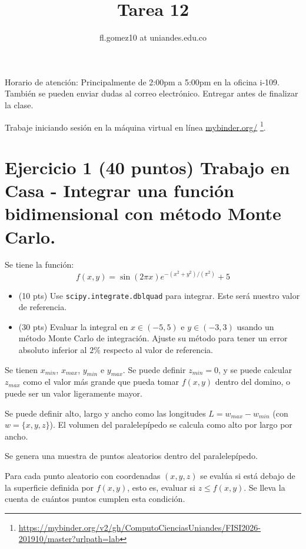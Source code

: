 \documentclass{article}
\title{Tarea 12}
\author{fl.gomez10 at uniandes.edu.co}
\begin{document}
\maketitle

Horario de atención: Principalmente de 2:00pm a 5:00pm en la oficina i-109.
También se pueden enviar dudas al correo electrónico.
Entregar antes de finalizar la clase. 

Trabaje iniciando  sesión en la máquina virtual en línea
\href{https://mybinder.org/v2/gh/ComputoCienciasUniandes/FISI2026-201910/master?urlpath=lab}{mybinder.org/}
\footnote{\url{https://mybinder.org/v2/gh/ComputoCienciasUniandes/FISI2026-201910/master?urlpath=lab}}. 


\section{Ejercicio 1 (40 puntos) Trabajo en Casa - Integrar una función bidimensional con método Monte Carlo.}

Se tiene la función:
\begin{equation}
  f(x,y) = \sin \left(2 \pi x \right) e^{-(x^2 + y^2)/(\pi^2)} + 5
\end{equation}

\begin{itemize}
\item (10 pts) Use \texttt{scipy.integrate.dblquad} para integrar. Este será nuestro valor de referencia.
\item (30 pts) Evaluar la integral en $x \in(-5,5)$ e $y \in (-3,3)$ usando un método Monte Carlo de integración.
  Ajuste su método para tener un error absoluto inferior al $2\%$ respecto al valor de referencia.
\end{itemize}

Se tienen  $x_{min}$, $x_{max}$, $y_{min}$ e $y_{max}$. Se puede definir $z_{min}=0$, y se puede
calcular $z_{max}$ como el valor más grande que pueda tomar $f(x,y)$ dentro del domino, o puede
ser un valor ligeramente mayor.

Se puede definir alto, largo y ancho como las longitudes $L = w_{max} - w_{min}$ (con $w=\{x,y,z\}$).
El volumen del paralelepípedo se calcula como alto por largo por ancho.

Se genera una muestra de puntos aleatorios dentro del paralelepípedo.

Para cada punto aleatorio con coordenadas $(x,y,z)$ se evalúa si está debajo de la
superficie definida por $f(x,y)$, esto es, evaluar si  $z \leq f(x,y)$. Se lleva la
cuenta de cuántos puntos cumplen esta condición.
\end{document}
